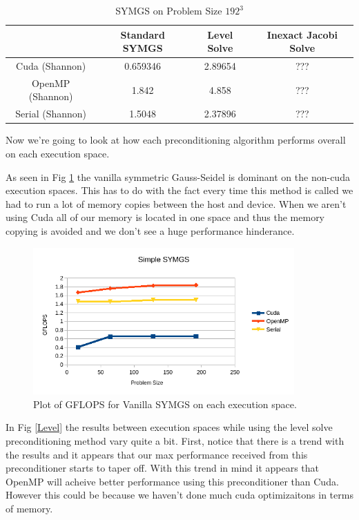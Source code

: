 \documentclass{ccr15}
\begin{document}
\begin{table}[h]
\begin{center}
\begin{tabular}{|c||c|c|c|}
\hline
& Standard SYMGS & Level Solve & Inexact Jacobi Solve \\
\hline \hline
Cuda (Shannon) & 0.659346 & 2.89654 & ??? \\
\hline
OpenMP (Shannon) & 1.842 & 4.858 & ??? \\
\hline
Serial (Shannon) & 1.5048 & 2.37896 & ??? \\
\hline
\end{tabular}
\caption{SYMGS on Problem Size $192^3$}
\label{SYMGS192}
\end{center}
\end{table}

Now we're going to look at how each preconditioning algorithm performs overall on each execution
space.

As seen in Fig \ref{Vanilla} the vanilla symmetric Gauss-Seidel is dominant on the non-cuda
execution spaces. This has to do with the fact every time this method is called we had to run
a lot of memory copies between the host and device. When we aren't using Cuda all of our memory
is located in one space and thus the memory copying is avoided and we don't see a huge
performance hinderance.

\begin{figure}[H]
  \centering
  \includegraphics[width=10cm]{plots/ZAB-VanillaSYMGS.png}
  \caption{Plot of GFLOPS for Vanilla SYMGS on each execution space.}
	\label{Vanilla}
\end{figure}

In Fig \ref{Level} the results between execution spaces while using the level solve
preconditioning method vary quite a bit. First, notice that there is a trend with the results and
it appears that our max performance received from this preconditioner starts to taper off. With
this trend in mind it appears that OpenMP will acheive better performance using this
preconditioner than Cuda. However this could be because we haven't done much cuda optimizaitons
in terms of memory.
\end{document}
